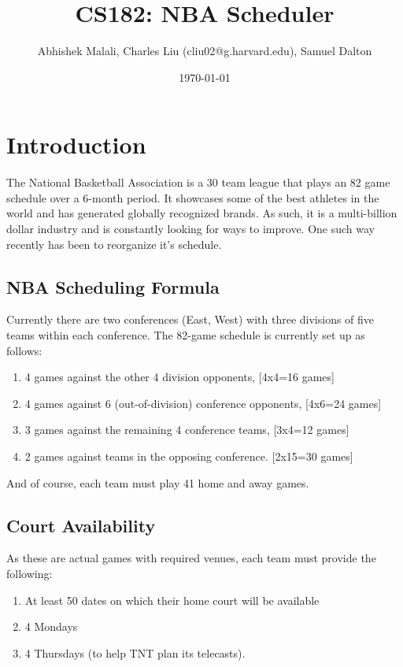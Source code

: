 \documentclass{article}
\begin{document}
	\title{CS182: NBA Scheduler}
	\author{Abhishek Malali, Charles Liu (cliu02@g.harvard.edu), Samuel Dalton}
	\date{\today}
	\maketitle
	
	\section{Introduction}
	
	The National Basketball Association is a 30 team league that plays an 82 game schedule over a 6-month period. It showcases some of the best athletes in the world and has generated globally recognized brands. As such, it is a multi-billion dollar industry and is constantly looking for ways to improve. One such way recently has been to reorganize it's schedule.
	
	\subsection{NBA Scheduling Formula}

	Currently there are two conferences (East, West) with three divisions of five teams within each conference. The 82-game schedule is currently set up as follows:

	\begin{enumerate}
		\item 4 games against the other 4 division opponents, [4x4=16 games]
		\item 4 games against 6 (out-of-division) conference opponents, [4x6=24 games]
		\item 3 games against the remaining 4 conference teams, [3x4=12 games]
		\item 2 games against teams in the opposing conference. [2x15=30 games]
	\end{enumerate}

	And of course, each team must play 41 home and away games. 
	
	\subsection{Court Availability}

	As these are actual games with required venues, each team must provide the following:

	\begin{enumerate}
		\item At least 50 dates on which their home court will be available
		\item 4 Mondays
		\item 4 Thursdays (to help TNT plan its telecasts).
	\end{enumerate}
\end{document}
